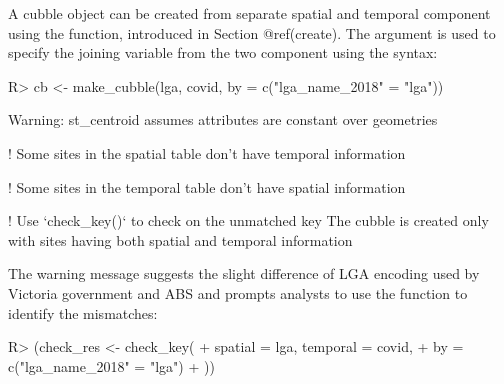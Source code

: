 \documentclass[
]{jss}
\begin{document}
A cubble object can be created from separate spatial and temporal
component using the  function, introduced in Section
@ref(create). The  argument is used to specify the joining
variable from the two component using the  
syntax:

\begin{CodeChunk}
\begin{CodeInput}
R> cb <- make_cubble(lga, covid, by = c("lga_name_2018" = "lga"))
\end{CodeInput}
\begin{CodeOutput}
Warning: st_centroid assumes attributes are constant over geometries
\end{CodeOutput}
\begin{CodeOutput}
! Some sites in the spatial table don't have temporal information
\end{CodeOutput}
\begin{CodeOutput}
! Some sites in the temporal table don't have spatial information
\end{CodeOutput}
\begin{CodeOutput}
! Use `check_key()` to check on the unmatched key
The cubble is created only with sites having both spatial and
temporal information
\end{CodeOutput}
\end{CodeChunk}

The warning message suggests the slight difference of LGA encoding used
by Victoria government and ABS and prompts analysts to use the function
 to identify the mismatches:

\begin{CodeChunk}
\begin{CodeInput}
R> (check_res <- check_key(
+   spatial = lga, temporal = covid, 
+   by = c("lga_name_2018" = "lga")
+ ))
\end{CodeInput}
\end{CodeChunk}
\end{document}
